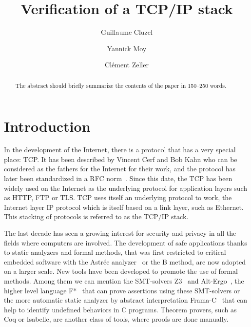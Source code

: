 \documentclass[runningheads]{llncs}
\title{Verification of a TCP/IP stack}
\author{Guillaume Cluzel\inst{1,2} \and
        Yannick Moy\inst{1} \and
        Cl\'ement Zeller\inst{3}}
\institute{Adacore \and
        \'Ecole Normale Sup\'erieure de Lyon \and
        Oryx Embedded}
\begin{document}

\maketitle

\begin{abstract}
    The abstract should briefly summarize the contents of the paper in
    150--250 words.

\end{abstract}

\section{Introduction}

    In the development of the Internet, there is a protocol that has a very special place: TCP.
    It has been described by Vincent Cerf and Bob Kahn who can be considered as the fathers for the Internet
    for their work, and the protocol has later been standardized in a RFC norm~\cite{rfc793}.
    Since this date, the TCP has been widely used on the Internet as the underlying protocol for application layers such as HTTP,
    FTP or TLS. TCP uses itself an underlying protocol to work, the Internet layer IP protocol which is itself
    based on a link layer, such as Ethernet. This stacking of protocols is referred to as the TCP/IP stack.

    The last decade has seen a growing interest for security and privacy in all the fields where computers are
    involved. The development of safe applications thanks to static analyzers and formal methods, that was first
    restricted to critical embedded software with the Astr\'ee analyzer~\cite{cousot2005astree} or the B method, are
    now adopted on a larger scale. New tools have been developed to promote the use of formal methods. Among them we
    can mention the SMT-solvers Z3~\cite{de2008z3} and Alt-Ergo~\cite{conchon:hal-01960203},
    the higher level language F*~\cite{mumon} that can prove assertions
    using these SMT-solvers or the more automatic static analyzer by abstract interpretation Frama-C~\cite{cuoq2012frama}
    that can help to identify undefined behaviors in C programs. Theorem provers, such as Coq or Isabelle, are another class
    of tools, where proofs are done manually.
\end{document}
